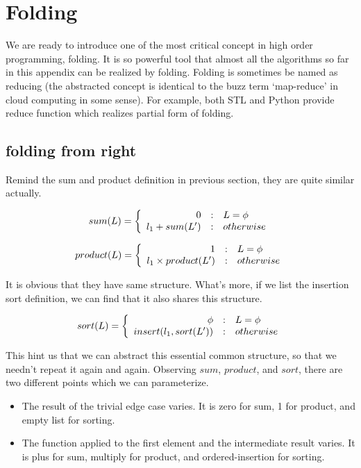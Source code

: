 \documentclass[UTF8]{article}
\begin{document}
\section{Folding}

We are ready to introduce one of the most critical concept in high order programming, folding. It is so powerful tool
that almost all the algorithms so far in this appendix can be realized by folding. Folding is sometimes be named as
reducing (the abstracted concept is identical to the buzz term `map-reduce' in cloud computing in some sense). For example,
both STL and Python provide reduce function which realizes partial form of folding.

\subsection{folding from right}
Remind the sum and product definition in previous section, they are quite similar actually.

\[
sum(L) =  \left \{
  \begin{array}
  {r@{\quad:\quad}l}
  0 & L = \phi \\
  l_1 + sum(L') & otherwise
  \end{array}
\right.
\]

\[
product(L) = \left \{
  \begin{array}
  {r@{\quad:\quad}l}
  1 & L = \phi \\
  l_1 \times product(L') & otherwise
  \end{array}
\right.
\]

It is obvious that they have same structure. What's more, if we list the insertion sort definition, we can
find that it also shares this structure.

\[
sort(L) = \left \{
  \begin{array}
  {r@{\quad:\quad}l}
  \phi & L = \phi \\
  insert(l_1, sort(L')) & otherwise
  \end{array}
\right.
\]

This hint us that we can abstract this essential common structure, so that we needn't repeat it again and again.
Observing $sum$, $product$, and $sort$, there are two different points which we can parameterize.

\begin{itemize}
\item The result of the trivial edge case varies. It is zero for sum, 1 for product, and empty list for sorting.
\item The function applied to the first element and the intermediate result varies. It is plus for sum, multiply for product,
and ordered-insertion for sorting.
\end{itemize}
\end{document}
